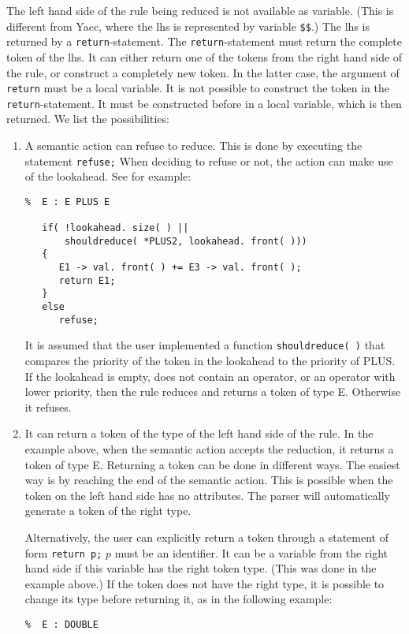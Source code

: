 \documentclass{article}
\begin{document}
\noindent
The left hand side of the rule being reduced is not available
as variable. (This is different from Yacc, where the 
lhs is represented by variable \verb+$$+.)
The lhs is returned by a \verb+return+-statement.
The \verb+return+-statement must return the complete token
of the lhs. It can either return one of the tokens from
the right hand side of the rule, or construct a completely
new token. In the latter case, the argument of \verb+return+ 
must be a local variable. It is not possible to construct
the token in the \verb+return+-statement. It must be constructed
before in a local variable, which is then returned. 
We list the possibilities: 
\begin{enumerate}
\item
   A semantic action can refuse to reduce. This is done by executing 
   the statement \verb+refuse;+ 
   When deciding to refuse or not, the action can make use of the lookahead.
   See for example:
\begin{verbatim} 
%  E : E PLUS E

   if( !lookahead. size( ) || 
       shouldreduce( *PLUS2, lookahead. front( )))
   {
      E1 -> val. front( ) += E3 -> val. front( );
      return E1;
   }
   else
      refuse;
\end{verbatim}
   It is assumed that the user implemented a function 
   \verb+shouldreduce( )+ that compares the priority of the token 
   in the lookahead to the priority of PLUS. If the lookahead is empty,   
   does not contain an operator, or an operator with lower priority, then
   the rule reduces and returns a token of type E. Otherwise it refuses.

\item
   It can return a token of the type of the left hand side of the rule.
   In the example above, when the semantic action accepts the reduction, 
   it returns a token of type E.
   Returning a token can be done in different ways. The easiest way
   is by reaching the end of the semantic action. 
   This is possible when the token on the left hand side has no
   attributes. 
   The parser will automatically generate a token of the right type. 
   
   \noindent
   Alternatively, the user can explicitly return a token through
   a statement of form \verb+return p;+ 
   $ p $ must be an identifier. It can be a variable from 
   the right hand side if this variable has the right token type.
   (This was done in the example above.)
   If the token does not have the right type, it is possible to change
   its type before returning it, as in the following example:
\begin{verbatim}
%  E : DOUBLE


\end{verbatim}
\end{enumerate}
\end{document}
